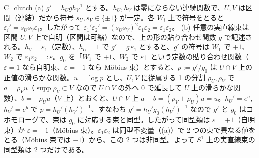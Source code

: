 \begin{soll}{C_clutch}
(a) $g'=h_Ugh_V^{-1}$ とする。$h_U,h_V$ は零にならない連続関数で、$U,V$ は区間（連結）だから符号 $s_U,s_V\in\{\pm1\}$ が一定。各 $W_i$ 上で符号をとると $\varepsilon_i'=s_Us_V\varepsilon_i$。したがって $\varepsilon_1'\varepsilon_2'=(s_Us_V)^2\varepsilon_1\varepsilon_2=\varepsilon_1\varepsilon_2$。
(b) 任意の実直線束は区間 $U,V$ 上で自明（区間は可縮）なので、上の形の貼り合わせ関数 $g$ で記述される。$h_V=\varepsilon_1$（定数）、$h_U=1$ で $g'=g\,\varepsilon_1$ とすると、$g'$ の符号は $W_1$ で $+1$、$W_2$ で $\varepsilon_1\varepsilon_2=:\varepsilon$。$g_0$ を「$W_1$ で $+1$、$W_2$ で $\varepsilon$」という定数の貼り合わせ関数（$\varepsilon=1$ なら自明束、$\varepsilon=-1$ なら Möbius 束）とすると、$p:=g'/g_0$ は $U\cap V$ 上の正値の滑らかな関数。$u=\log p$ とし、$U,V$ に従属する 1 の分割 $\rho_U,\rho_V$ で $a=\rho_Vu$（$\operatorname{supp}\rho_V\subset V$ なので $U\cap V$ の外へ $0$ で延長して $U$ 上の滑らかな関数）、$b=-\rho_Uu$（$V$ 上）とおくと、$U\cap V$ 上 $a-b=(\rho_V+\rho_U)u=u$。$h_U'=e^a$, $h_V'=e^b$ で $p=h_U'(h_V')^{-1}$、すなわち $g'=h_U'g_0(h_V')^{-1}$ なので $g'$ と $g_0$ はコホモローグで、束は $g_0$ に対応する束と同型。したがって同型類は $\varepsilon=+1$（自明束）か $\varepsilon=-1$（Möbius 束）。$\varepsilon_1\varepsilon_2$ は同型不変量（(a)）で 2 つの束で異なる値をとる（Möbius 束では $-1$）から、この 2 つは非同型。よって $S^1$ 上の実直線束の同型類は 2 つだけである。
\end{soll}


